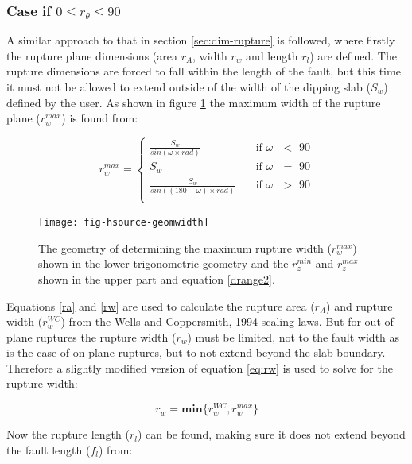\subsubsection{Case if  $0 \leq r_\theta \leq 90$} \label{sec:0to90}

A similar approach to that in section \ref{sec:dim-rupture} is followed, where firstly the rupture plane dimensions (area $r_A$, width $r_w$ and length $r_l$) are defined. The rupture dimensions are forced to fall 
within the length of the fault, but this time it must not be allowed to extend outside of the width of the dipping slab ($S_w$) defined by the user. As shown in figure \ref{fig:deltaeq} the 
maximum width of the rupture plane ($r_w^{max}$) is found from:

\begin{equation}\label{rwmax}
r_w^{max} = 
\begin{cases}
 \frac{ S_w }{sin (\omega \times rad)}		& \quad \mbox{if $\omega$ $<$ 90} \\
S_w							& \quad \mbox{if $\omega$ $=$ 90} \\
 \frac{ S_w }{sin ((180 - \omega ) \times rad)}	& \quad \mbox{if $\omega$ $>$ 90} \\
\end{cases}
\end{equation}


\begin{figure}[htp]
\centerline{\texttt{[image: fig-hsource-geomwidth]}}
\caption{The geometry of determining the maximum rupture width ($r_w^{max}$) shown in the lower trigonometric geometry and the $r_z^{min}$ and $r_z^{max}$ shown in the upper part and equation \ref{drange2}.}
\label{fig:deltaeq}
\end{figure}

Equations \ref{ra} and \ref{rw} are used to calculate the rupture area ($r_A$) and rupture width ($r_w^{WC}$) from the Wells and Coppersmith, 1994 scaling laws. But for out of plane ruptures 
the rupture width ($r_w$) must be limited, not to the fault width as is the case of on plane ruptures, but to not extend beyond the slab boundary. Therefore a slightly modified version of 
equation \ref{eq:rw} is used to solve for the rupture width:

\begin{equation} \label{rw090}
r_w = \mathbf{min}\{ r_w^{WC}, r_w^{max}\}
\end{equation}

Now the rupture length ($r_l$) can be found, making sure it does not extend beyond the fault length ($f_l$) from:

